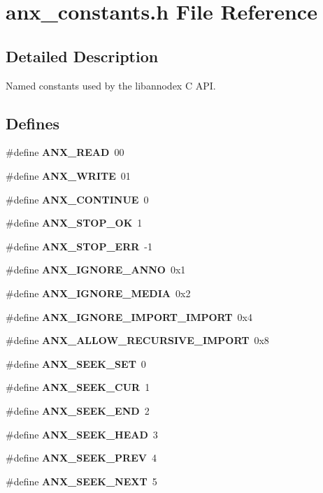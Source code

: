 \section{anx\_\-constants.h File Reference}
\label{anx__constants_8h}


\subsection{Detailed Description}
Named constants used by the libannodex C API. 



\subsection*{Defines}
\begin{CompactItemize}
\item 
\#define {\bf ANX\_\-READ}\ 00\label{anx__constants_8h_a0}

\item 
\#define {\bf ANX\_\-WRITE}\ 01\label{anx__constants_8h_a1}

\item 
\#define {\bf ANX\_\-CONTINUE}\ 0\label{anx__constants_8h_a2}

\item 
\#define {\bf ANX\_\-STOP\_\-OK}\ 1\label{anx__constants_8h_a3}

\item 
\#define {\bf ANX\_\-STOP\_\-ERR}\ -1\label{anx__constants_8h_a4}

\item 
\#define {\bf ANX\_\-IGNORE\_\-ANNO}\ 0x1\label{anx__constants_8h_a5}

\item 
\#define {\bf ANX\_\-IGNORE\_\-MEDIA}\ 0x2\label{anx__constants_8h_a6}

\item 
\#define {\bf ANX\_\-IGNORE\_\-IMPORT\_\-IMPORT}\ 0x4\label{anx__constants_8h_a7}

\item 
\#define {\bf ANX\_\-ALLOW\_\-RECURSIVE\_\-IMPORT}\ 0x8\label{anx__constants_8h_a8}

\item 
\#define {\bf ANX\_\-SEEK\_\-SET}\ 0\label{anx__constants_8h_a9}

\item 
\#define {\bf ANX\_\-SEEK\_\-CUR}\ 1\label{anx__constants_8h_a10}

\item 
\#define {\bf ANX\_\-SEEK\_\-END}\ 2\label{anx__constants_8h_a11}

\item 
\#define {\bf ANX\_\-SEEK\_\-HEAD}\ 3\label{anx__constants_8h_a12}

\item 
\#define {\bf ANX\_\-SEEK\_\-PREV}\ 4\label{anx__constants_8h_a13}

\item 
\#define {\bf ANX\_\-SEEK\_\-NEXT}\ 5\label{anx__constants_8h_a14}

\end{CompactItemize}
